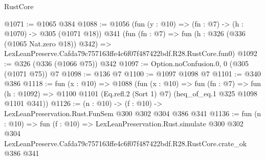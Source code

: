 \begin{lexlean}{RustCore}
\begin{coremodule}
@1071 := @1065 @384
@1088 := @1056
    (fun (y : @10) => (fn : @7) -> (h : @1070) -> @305 (@1071 @18))
    @341
    (fun (fn : @7) =>
    fun (h : @326 (@336 (@1065 Nat.zero @18)) @342) =>
    LexLeanPreserve.Cafda79c757163ffe4c6f07f487422bdf.R28.RustCore.fun0)
@1092 := @326 (@336 (@1066 @75)) @342
@1097 := Option.noConfusion.{0, 0} (@305 (@1071 @75)) @7
@1098 := @136 @7
@1100 := @1097 @1098 @7
@1101 := @340 @386
@1118 := fun (x : @10) =>
  @1088
    (fun (x : @10) =>
    fun (fn : @7) =>
    fun (h : @1092) => @1100 @1101 (Eq.refl.{2} (Sort 1) @7) (heq_of_eq.{1} @325 @1098 @1101 @341))
@1126 := (n : @10) -> (f : @10) -> LexLeanPreservation.Rust.FunSem @300 @302 @304 @386 @341
@1136 := fun (n : @10) =>
  fun (f : @10) =>
  LexLeanPreservation.Rust.simulate
    @300
    @302
    @304
    LexLeanPreserve.Cafda79c757163ffe4c6f07f487422bdf.R28.RustCore.crate_ok
    @386
    @341
\end{coremodule}
\end{lexlean}
